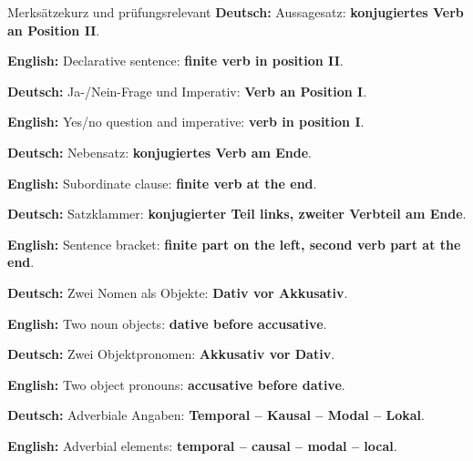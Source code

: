 \documentclass[a4paper,11pt]{article}
\newcommand{\GermanText}[1]{\textbf{Deutsch: }#1\par}
\newcommand{\EnglishText}[1]{{\small\color{SoftGray}\textbf{English: }#1\par}}
\begin{document}
        \begin{grammarentry}{Merksätze}{kurz und prüfungsrelevant}
            \GermanText{Aussagesatz: \textbf{konjugiertes Verb an Position II}.}
            \EnglishText{Declarative sentence: \textbf{finite verb in position II}.}
            
            \GermanText{Ja-/Nein-Frage und Imperativ: \textbf{Verb an Position I}.}
            \EnglishText{Yes/no question and imperative: \textbf{verb in position I}.}
            
            \GermanText{Nebensatz: \textbf{konjugiertes Verb am Ende}.}
            \EnglishText{Subordinate clause: \textbf{finite verb at the end}.}
            
            \GermanText{Satzklammer: \textbf{konjugierter Teil links, zweiter Verbteil am Ende}.}
            \EnglishText{Sentence bracket: \textbf{finite part on the left, second verb part at the end}.}
            
            \GermanText{Zwei Nomen als Objekte: \textbf{Dativ vor Akkusativ}.}
            \EnglishText{Two noun objects: \textbf{dative before accusative}.}
            
            \GermanText{Zwei Objektpronomen: \textbf{Akkusativ vor Dativ}.}
            \EnglishText{Two object pronouns: \textbf{accusative before dative}.}
            
            \GermanText{Adverbiale Angaben: \textbf{Temporal -- Kausal -- Modal -- Lokal}.}
            \EnglishText{Adverbial elements: \textbf{temporal -- causal -- modal -- local}.}
        \end{grammarentry}
\end{document}
